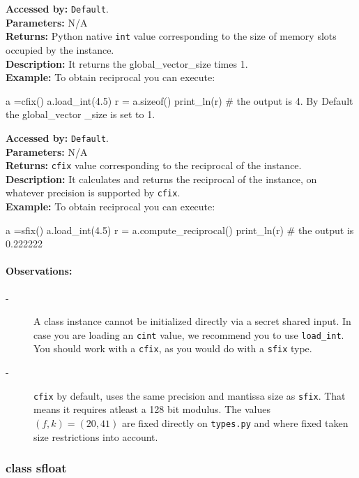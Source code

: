 		
			\textbf{Accessed by:} \verb|Default|.		 \\
			\textbf{Parameters:} N/A \\
			\textbf{Returns:}
				 Python native \verb|int| value corresponding to the size of memory slots occupied by the instance. \\
			\textbf{Description:}
				It returns the global_vector_size times 1. \\
	     	\textbf{Example:}
    		    To obtain reciprocal you can execute:
		     	\begin{mylisting}
				a =cfix()
				a.load_int(4.5)
				r = a.sizeof()
				print_ln(r)  # the output is 4. By Default the global_vector
				_size is set to 1.    	
     			\end{mylisting}	 
			\textbf{Accessed by:} \verb|Default|.		 \\
			\textbf{Parameters:} N/A \\
			\textbf{Returns:} \verb|cfix| value corresponding to the reciprocal of the instance. \\
			\textbf{Description:}
				It calculates and returns the reciprocal of the instance, on whatever precision is supported by \verb|cfix|.\\
	     	\textbf{Example:}
    		    To obtain reciprocal you can execute:
		     	\begin{mylisting}
				a =sfix()
				a.load_int(4.5)
				r = a.compute_reciprocal()
				print_ln(r)  # the output is 0.222222   	
     			\end{mylisting}	 
	\paragraph{Observations:}
	\begin{description}
	\item[-] A class instance cannot be initialized directly via a secret shared input. 
	In case you are loading an \verb|cint| value, we recommend you to use \verb|load_int|. 
	You should work with a \verb|cfix|, as you would do with a \verb|sfix| type.
	\item[-]\verb|cfix| by default, uses the same precision and mantissa size as \verb|sfix|. 
	That means it requires atleast a 128 bit modulus. 
    The values $(f,k)=(20,41)$ are fixed directly on \verb|types.py| and where fixed taken size restrictions into account.
	\end{description}

\subsubsection{class sfloat}

